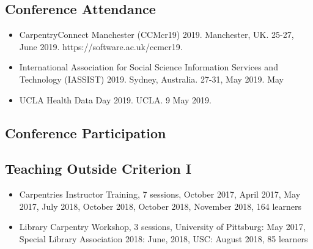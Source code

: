 \subsection{Conference Attendance}

\begin{itemize}[label={}]
  \item CarpentryConnect Manchester (CCMcr19) 2019. Manchester, UK. 25-27, June 2019. https://software.ac.uk/ccmcr19.
  \item International Association for Social Science Information Services and Technology (IASSIST) 2019. Sydney, Australia. 27-31, May 2019. May
  \item UCLA Health Data Day 2019. UCLA. 9 May 2019.
\end{itemize}


\subsection{Conference Participation}

\nocite{*}
\printbibliography[keyword={outlib-conf-part},title={Library-sponsored classes/workshops},heading=none]


\subsection{Teaching Outside Criterion I}
\begin{itemize}[label={}]
  \item Carpentries Instructor Training, 7 sessions,  October	2017, April	2017, May	2017, July	2018, October	2018, October	2018, November	2018,	164 learners
  \item Library Carpentry Workshop, 3 sessions, University of Pittsburg: May	2017, Special Library Association 2018: June, 2018, USC: August	2018,	85 learners
\end{itemize}
